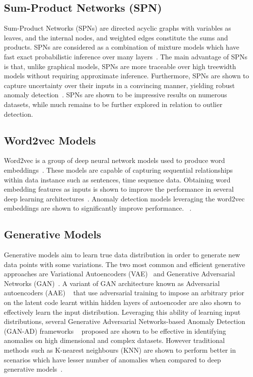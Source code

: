 \subsection{ Sum-Product Networks (SPN)}
\label{sec:spn}
Sum-Product Networks (SPNs) are directed acyclic graphs with variables as leaves, and the internal nodes, and weighted edges constitute the sums and products. SPNs are considered as a combination of mixture models  which have fast exact probabilistic inference over many layers~\cite{poon2011sum,peharz2018probabilistic}. The main advantage of SPNs is that, unlike graphical models, SPNs are more traceable over high treewidth models without requiring approximate inference. Furthermore, SPNs are shown to capture uncertainty over their inputs in a convincing manner, yielding robust anomaly detection~\cite{peharz2018probabilistic}. SPNs are shown to be  impressive results on numerous datasets, while much remains to be further explored in relation to outlier detection.

\subsection{Word2vec Models}
\label{sec:word2vec}
Word2vec is a group of deep neural network models used to produce word embeddings~\cite{mikolov2013efficient}. These models are capable of capturing sequential relationships within  data instance such as sentences, time sequence data. Obtaining word embedding features as inputs is shown to improve the performance in several deep learning architectures~\cite{rezaeinia2017improving,naili2017comparative,altszyler2016comparative}. Anomaly detection models leveraging the word2vec embeddings are shown to significantly improve performance. ~\cite{schnabel2015evaluation,bertero2017experience,bakarov2018anomaly,bamler2017dynamic}.


\subsection{Generative Models }
\label{sec:gan_adversarial}

Generative models aim to learn true data distribution in order to generate new data points with some variations. The two most common and efficient generative approaches are Variational Autoencoders (VAE)~\cite{kingma2013auto} and Generative Adversarial Networks (GAN)~\cite{NIPS2014_5423,goodfellow2014generative}. A variant of GAN architecture known as Adversarial autoencoders (AAE) ~\cite{makhzani2015adversarial} that use adversarial training to impose an arbitrary prior on the latent code learnt within hidden layers of autoencoder are also shown to effectively learn the input distribution. Leveraging this ability of learning input distributions, several Generative Adversarial Networks-based Anomaly Detection (GAN-AD) frameworks ~\cite{li2018anomaly,deecke2018anomaly,schlegl2017unsupervised,ravanbakhsh2017abnormal,eide2018applying}
 proposed are shown to be effective in identifying anomalies on high dimensional and complex datasets. However traditional methods such as K-nearest neighbours (KNN) are shown to perform better in scenarios which have lesser number of anomalies when compared to deep generative models~\cite{vskvara2018generative}.

